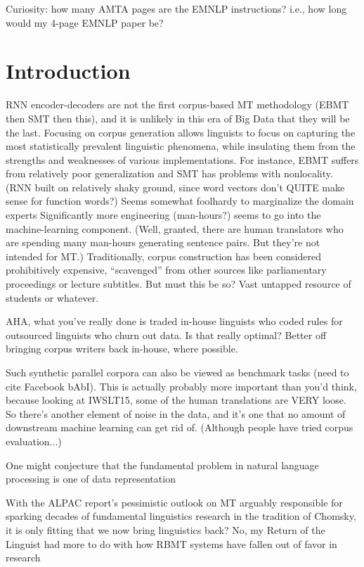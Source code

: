 Curiosity: how many AMTA pages are the EMNLP instructions? i.e., how long would my 4-page EMNLP paper be?


\section{Introduction}

RNN encoder-decoders are not the first corpus-based MT methodology (EBMT then SMT then this), and it is unlikely in this era of Big Data that they will be the last.
Focusing on corpus generation allows linguists to focus on capturing the most statistically prevalent linguistic phenomena, while insulating them from the strengths and weaknesses of various implementations.
For instance, EBMT suffers from relatively poor generalization and SMT has problems with nonlocality.
(RNN built on relatively shaky ground, since word vectors don't QUITE make sense for function words?)
Seems somewhat foolhardy to marginalize the domain experts
Significantly more engineering (man-hours?) seems to go into the machine-learning component.  (Well, granted, there are human translators who are spending many man-hours generating sentence pairs. But they're not intended for MT.)
Traditionally, corpus construction has been considered prohibitively expensive, ``scavenged'' from other sources like parliamentary proceedings or lecture subtitles.
But must this be so? Vast untapped resource of students or whatever.

AHA, what you've really done is traded in-house linguists who coded rules for outsourced linguists who churn out data.
Is that really optimal?
Better off bringing corpus writers back in-house, where possible.
 
Such synthetic parallel corpora can also be viewed as benchmark tasks (need to cite Facebook bAbI).
This is actually probably more important than you'd think, because looking at IWSLT15, some of the human translations are VERY loose.
So there's another element of noise in the data, and it's one that no amount of downstream machine learning can get rid of.
(Although people have tried corpus evaluation...)

One might conjecture that the fundamental problem in natural language processing is one of data representation

With the ALPAC report's pessimistic outlook on MT arguably responsible for sparking decades of fundamental linguistics research in the tradition of Chomsky, it is only fitting that we now bring linguistics back?
No, my Return of the Linguist had more to do with how RBMT systems have fallen out of favor in research

